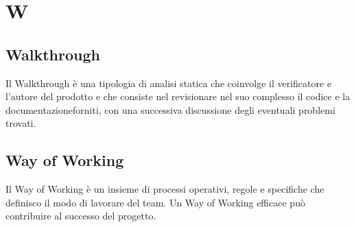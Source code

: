 \section{W} 
\subsection{Walkthrough} 
Il Walkthrough è una tipologia di analisi statica che coinvolge il verificatore e l’autore del prodotto e che consiste nel revisionare nel suo complesso il codice e la documentazioneforniti, con una successiva discussione degli eventuali problemi trovati.
\subsection{Way of Working} 
Il Way of Working è un insieme di processi operativi, regole e specifiche che definisco il modo di lavorare del team. Un Way of Working efficace può contribuire al successo del progetto.
